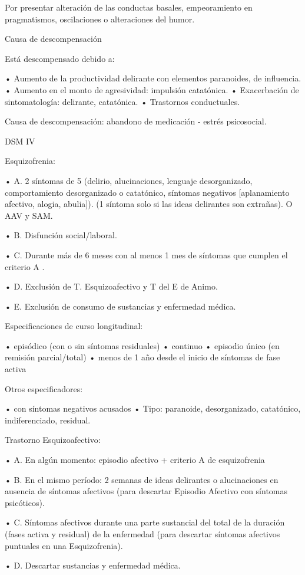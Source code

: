 \documentclass[encares.tex]{subfiles}
\begin{document}
Por presentar alteración de las conductas basales, empeoramiento en pragmatismos, oscilaciones o alteraciones del humor.

Causa de descompensación

Está descompensado debido a:

• Aumento de la productividad delirante con elementos paranoides, de influencia.
• Aumento en el monto de agresividad: impulsión catatónica.
• Exacerbación de sintomatología: delirante, catatónica.
• Trastornos conductuales.

Causa de descompensación: abandono de medicación - estrés psicosocial.

DSM IV

Esquizofrenia:

• A. 2 síntomas de 5 (delirio, alucinaciones, lenguaje desorganizado, comportamiento desorganizado o catatónico, síntomas negativos [aplanamiento afectivo, alogia, abulia]). (1 síntoma solo si las ideas delirantes son extrañas). O AAV y SAM.

• B. Disfunción social/laboral.

• C. Durante más de 6 meses con al menos 1 mes de síntomas que cumplen el criterio A .

• D. Exclusión de T. Esquizoafectivo y T del E de Animo.

• E. Exclusión de consumo de sustancias y enfermedad médica.

Especificaciones de curso longitudinal:

• episódico (con o sin síntomas residuales)
• continuo
• episodio único (en remisión parcial/total)
• menos de 1 año desde el inicio de síntomas de fase activa

Otros especificadores:

• con síntomas negativos acusados
• Tipo: paranoide, desorganizado, catatónico, indiferenciado, residual.

Trastorno Esquizoafectivo:

• A. En algún momento: episodio afectivo + criterio A de esquizofrenia

• B. En el mismo período: 2 semanas de ideas delirantes o alucinaciones en ausencia de síntomas afectivos (para descartar Episodio Afectivo con síntomas psicóticos).

• C. Síntomas afectivos durante una parte sustancial del total de la duración (fases activa y residual) de la enfermedad (para descartar síntomas afectivos puntuales en una Esquizofrenia).

• D. Descartar sustancias y enfermedad médica.
\end{document}
